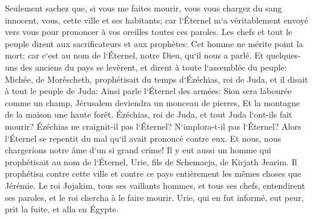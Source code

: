 \verse Seulement sachez que, si vous me faites mourir, vous vous chargez du sang innocent, vous, cette ville et ses habitants; car l`Éternel m`a véritablement envoyé vers vous pour prononcer à vos oreilles toutes ces paroles. 
\verse Les chefs et tout le peuple dirent aux sacrificateurs et aux prophètes: Cet homme ne mérite point la mort; car c`est au nom de l`Éternel, notre Dieu, qu`il nous a parlé. 
\verse Et quelques-uns des anciens du pays se levèrent, et dirent à toute l`assemblée du peuple: 
\verse Michée, de Moréscheth, prophétisait du temps d`Ézéchias, roi de Juda, et il disait à tout le peuple de Juda: Ainsi parle l`Éternel des armées: Sion sera labourée comme un champ, Jérusalem deviendra un monceau de pierres, Et la montagne de la maison une haute forêt. 
\verse Ézéchias, roi de Juda, et tout Juda l`ont-ils fait mourir? Ézéchias ne craignit-il pas l`Éternel? N`implora-t-il pas l`Éternel? Alors l`Éternel se repentit du mal qu`il avait prononcé contre eux. Et nous, nous chargerions notre âme d`un si grand crime! 
\verse Il y eut aussi un homme qui prophétisait au nom de l`Éternel, Urie, fils de Schemaeja, de Kirjath Jearim. Il prophétisa contre cette ville et contre ce pays entièrement les mêmes choses que Jérémie. 
\verse Le roi Jojakim, tous ses vaillants hommes, et tous ses chefs, entendirent ses paroles, et le roi chercha à le faire mourir. Urie, qui en fut informé, eut peur, prit la fuite, et alla en Égypte. 
